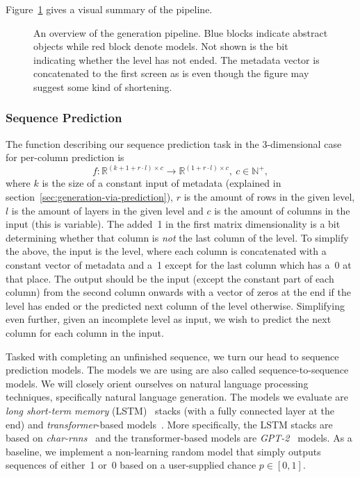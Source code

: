 Figure~\ref{fig:pipeline} gives a visual summary of the pipeline.

\begin{figure}[t]
  \centering
  
  \caption{An overview of the generation pipeline. Blue blocks
    indicate abstract objects while red block denote models. Not shown
    is the bit indicating whether the level has not ended. The
    metadata vector is concatenated to the first screen as is even
    though the figure may suggest some kind of shortening.}
  \label{fig:pipeline}
\end{figure}

\subsubsection{Sequence Prediction}
\label{sec:sequence-prediction}

The function describing our sequence prediction task in the
3-dimensional case for per-column prediction is
\begin{equation*}
  f: \mathbb{R}^{(k + 1 + r \cdot l) \times c} \to \mathbb{R}^{(1 + r \cdot l) \times c},\ c \in \mathbb{N}^{+},
\end{equation*}
where $k$ is the size of a constant input of metadata (explained in
section~\ref{sec:generation-via-prediction}), $r$ is the amount of
rows in the given level, $l$ is the amount of layers in the given
level and $c$ is the amount of columns in the input (this is
variable). The added~1 in the first matrix dimensionality is a bit
determining whether that column is \emph{not} the last column of the
level. To simplify the above, the input is the level, where each
column is concatenated with a constant vector of metadata and a~1
except for the last column which has a~0 at that place. The output
should be the input (except the constant part of each column) from the
second column onwards with a vector of zeros at the end if the level
has ended or the predicted next column of the level otherwise.
Simplifying even further, given an incomplete level as input, we wish
to predict the next column for each column in the input.

Tasked with completing an unfinished sequence, we turn our head to
sequence prediction models. The models we are using are also called
sequence-to-sequence models. We will closely orient ourselves on
natural language processing techniques, specifically natural language
generation. The models we evaluate are \emph{long short-term memory}
(LSTM)~\cite{hochreiterLongShorttermMemory1997} stacks (with a fully
connected layer at the end) and \emph{transformer}-based
models~\cite{vaswaniAttentionAllYou2017}. More specifically, the LSTM
stacks are based on \emph{char-rnns}~\cite{andrejKarpathyCharrnn2019}
and the transformer-based models are
\mbox{\emph{GPT-2}}~\cite{radfordLanguageModelsAre,OpenaiGpt22019}
models. As a baseline, we implement a non-learning random model that
simply outputs sequences of either~1 or~0 based on a user-supplied
chance $p \in [0, 1]$.

